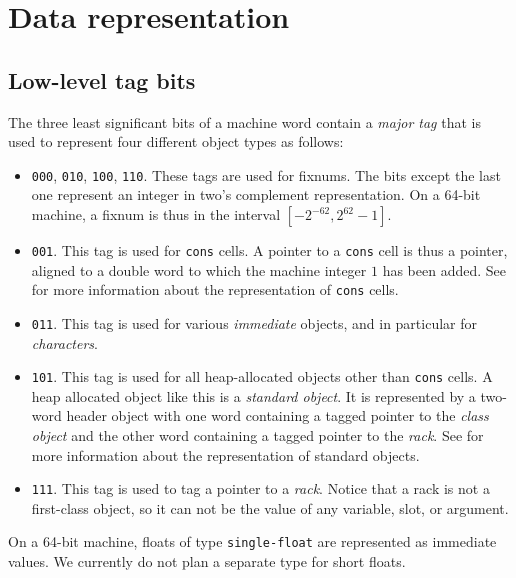 \chapter{Data representation}
\label{chap-data-representation}

\section{Low-level tag bits}

The three least significant bits of a machine word contain a
\emph{major tag} that is used to represent four different object types
as follows:

\begin{itemize}
\item \texttt{000}, \texttt{010}, \texttt{100}, \texttt{110}.  These
  tags are used for fixnums.  The bits except the last one represent
  an integer in two's complement representation.  On a 64-bit machine,
  a fixnum is thus in the interval $[-2^{-62}, 2^{62} - 1]$.
\item \texttt{001}.  This tag is used for \texttt{cons} cells.  A
  pointer to a \texttt{cons} cell is thus a pointer, aligned to a
  double word to which the machine integer $1$ has been added.  See
   for more information
  about the representation of \texttt{cons} cells.
\item \texttt{011}.  This tag is used for various \emph{immediate}
  objects, and in particular for \emph{characters}.
\item \texttt{101}.  This tag is used for all heap-allocated
  \commonlisp{} objects other than \texttt{cons} cells.  A heap
  allocated object like this is a \emph{standard object}.  It
  is represented by a two-word header object with one word containing
  a tagged pointer to the \emph{class object} and the other word
  containing a tagged pointer to the \emph{rack}.  See
   for more
  information about the representation of standard objects.
\item \texttt{111}.  This tag is used to tag a pointer to a
  \emph{rack}.  Notice that a rack is not a first-class \commonlisp{}
  object, so it can not be the value of any variable, slot, or
  argument.
\end{itemize}

On a 64-bit machine, floats of type \texttt{single-float} are
represented as immediate values.  We currently do not plan a separate
type for short floats.

